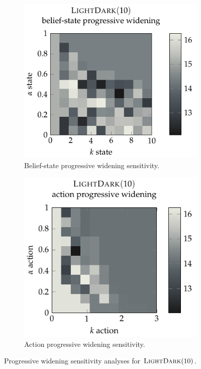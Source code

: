 \begin{figure}[b!]
    \centering
    \begin{subfigure}[t]{0.49\linewidth}
        \centering
        \includegraphics[width=\linewidth]{figures/betazero/appendix/spw_sweep_ld10.pdf}
        \caption{Belief-state progressive widening sensitivity.}
        \label{fig:spw_sensitivity_ld10}
    \end{subfigure}
    \hfill
    \begin{subfigure}[t]{0.475\linewidth}
        \centering
        \includegraphics[width=\linewidth]{figures/betazero/appendix/apw_sweep_ld10.pdf}
        \caption{Action progressive widening sensitivity.}
        \label{fig:apw_sensitivity_ld10}
    \end{subfigure}
    \caption{Progressive widening sensitivity analyses for $\textsc{LightDark}(10)$.}
    \label{fig:pw_sensitivity_ld10}
\end{figure}


